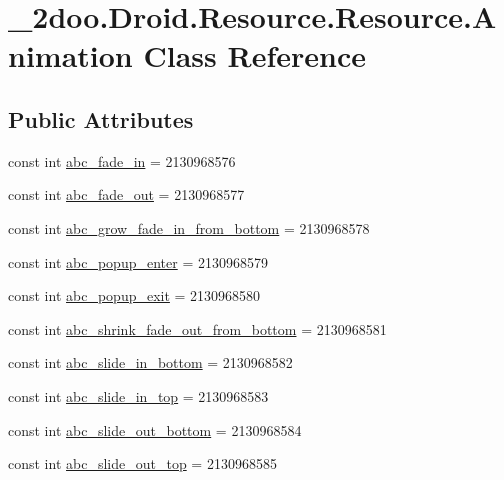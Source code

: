 \hypertarget{class__2doo_1_1_droid_1_1_resource_1_1_animation}{
\section{\_\-2doo.Droid.Resource.Resource.Animation Class Reference}
\label{class__2doo_1_1_droid_1_1_resource_1_1_animation}
}
\subsection*{Public Attributes}
\begin{CompactItemize}
\item 
const int \hyperlink{class__2doo_1_1_droid_1_1_resource_1_1_animation_dfc86c89ff41438954533b2bd1ffb623}{abc\_\-fade\_\-in} = 2130968576
\item 
const int \hyperlink{class__2doo_1_1_droid_1_1_resource_1_1_animation_8da9c600f9e268db2a9f33a82aa57822}{abc\_\-fade\_\-out} = 2130968577
\item 
const int \hyperlink{class__2doo_1_1_droid_1_1_resource_1_1_animation_92184652698454309031384a235bcff0}{abc\_\-grow\_\-fade\_\-in\_\-from\_\-bottom} = 2130968578
\item 
const int \hyperlink{class__2doo_1_1_droid_1_1_resource_1_1_animation_e6510899ec9b7c7b42fbc36fffd60f22}{abc\_\-popup\_\-enter} = 2130968579
\item 
const int \hyperlink{class__2doo_1_1_droid_1_1_resource_1_1_animation_974120b927b87d71f97a6c54ad3eece7}{abc\_\-popup\_\-exit} = 2130968580
\item 
const int \hyperlink{class__2doo_1_1_droid_1_1_resource_1_1_animation_e445abe7217569c4157e40cfb0d64ced}{abc\_\-shrink\_\-fade\_\-out\_\-from\_\-bottom} = 2130968581
\item 
const int \hyperlink{class__2doo_1_1_droid_1_1_resource_1_1_animation_d6a843354b188992742e663629f8c7aa}{abc\_\-slide\_\-in\_\-bottom} = 2130968582
\item 
const int \hyperlink{class__2doo_1_1_droid_1_1_resource_1_1_animation_193ff33cbbf63f7a02e40f61d600c91a}{abc\_\-slide\_\-in\_\-top} = 2130968583
\item 
const int \hyperlink{class__2doo_1_1_droid_1_1_resource_1_1_animation_351607b447d7a765fcf650e60e415025}{abc\_\-slide\_\-out\_\-bottom} = 2130968584
\item 
const int \hyperlink{class__2doo_1_1_droid_1_1_resource_1_1_animation_bfa6f1c5461e58c09df99129e27398f0}{abc\_\-slide\_\-out\_\-top} = 2130968585

\end{CompactItemize}
